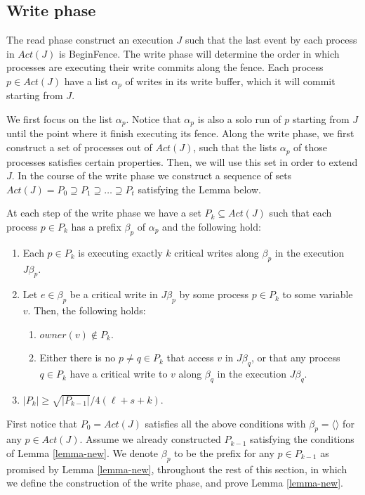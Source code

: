 \newpage
\subsection{Write phase}
The read phase construct an execution $J$ such that the last event by each process in $Act(J)$ is BeginFence. The write phase will determine the order in which processes are executing their write commits along the fence. Each process $p \in Act(J)$ have a list $\alpha_p$ of writes in its write buffer, which it will commit starting from $J$.

We first focus on the list $\alpha_p$. Notice that $\alpha_p$ is also a solo run of $p$ starting from $J$ until the point where it finish executing its fence. Along the write phase, we first construct a set of processes out of $Act(J)$, such that the lists $\alpha_p$ of those processes satisfies certain properties. Then, we will use this set in order to extend $J$.
In the course of the write phase we construct a sequence of sets $Act(J) = P_0 \supseteq P_1 \supseteq \ldots \supseteq P_t$ satisfying the Lemma below.

\begin{lemma} \label{lemma-new}
	At each step of the write phase we have a set $P_k \subseteq Act(J)$ such that each process $p \in P_k$ has a prefix $\beta_p$ of $\alpha_p$ and the following hold:
	\begin{enumerate}[(1)]
		\item Each $p \in P_k$ is executing exactly $k$ critical writes along $\beta_p$ in the execution $J \beta_p$.
		\item Let $e \in \beta_p$ be a critical write in $J \beta_p$ by some process $p \in P_k$ to some variable $v$. Then, the following holds:
		\begin{enumerate}
			\item $owner(v) \notin P_k$.
			\item Either there is no $p \neq q \in P_k$ that access $v$ in $J \beta_q$, or that any process $q \in P_k$ have a critical write to $v$ along $\beta_q$ in the execution $J \beta_q$.
		\end{enumerate}
		\item $|P_k| \geq \sqrt{|P_{k-1}|}/4(\ell+s+k)$.
	\end{enumerate}
\end{lemma}

First notice that $P_0=Act(J)$ satisfies all the above conditions with $\beta_p=\langle \rangle$ for any $p \in Act(J)$. Assume we already constructed $P_{k-1}$ satisfying the conditions of Lemma \ref{lemma-new}. We denote $\beta_p$ to be the prefix for any $p \in P_{k-1}$ as promised by Lemma \ref{lemma-new}, throughout the rest of this section, in which we define the construction of the write phase, and prove Lemma \ref{lemma-new}.

